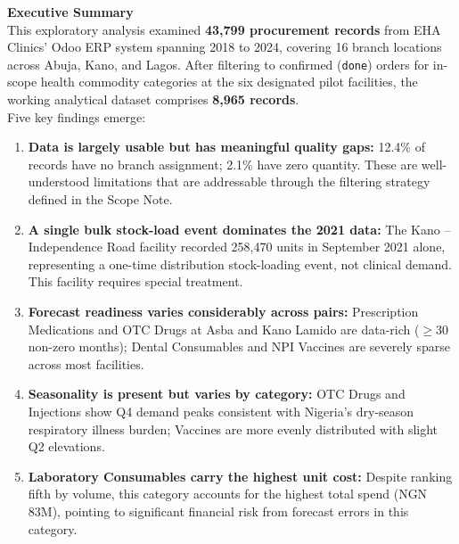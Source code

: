 \documentclass[12pt, a4paper]{article}
\newcounter{finding}
\begin{document}
\begin{mdframed}[style=keybox]
\textbf{\large Executive Summary}\\[0.6em]
This exploratory analysis examined \textbf{43,799 procurement records} from
EHA Clinics' Odoo ERP system spanning 2018 to 2024, covering 16 branch
locations across Abuja, Kano, and Lagos. After filtering to confirmed
(\texttt{done}) orders for in-scope health commodity categories at the six
designated pilot facilities, the working analytical dataset comprises
\textbf{8,965 records}.\\[0.5em]

Five key findings emerge:
\begin{enumerate}[leftmargin=1.5em, itemsep=3pt]
  \item \textbf{Data is largely usable but has meaningful quality gaps:}
        12.4\% of records have no branch assignment; 2.1\% have zero quantity.
        These are well-understood limitations that are addressable through
        the filtering strategy defined in the Scope Note.
  \item \textbf{A single bulk stock-load event dominates the 2021 data:}
        The Kano -- Independence Road facility recorded 258,470 units in
        September 2021 alone, representing a one-time distribution stock-loading
        event, not clinical demand. This facility requires special treatment.
  \item \textbf{Forecast readiness varies considerably across pairs:}
        Prescription Medications and OTC Drugs at Asba and Kano Lamido are
        data-rich ($\geq$30 non-zero months); Dental Consumables and NPI
        Vaccines are severely sparse across most facilities.
  \item \textbf{Seasonality is present but varies by category:}
        OTC Drugs and Injections show Q4 demand peaks consistent with
        Nigeria's dry-season respiratory illness burden; Vaccines are
        more evenly distributed with slight Q2 elevations.
  \item \textbf{Laboratory Consumables carry the highest unit cost:}
        Despite ranking fifth by volume, this category accounts for the
        highest total spend (NGN 83M), pointing to significant financial
        risk from forecast errors in this category.
\end{enumerate}
\end{mdframed}

\newpage
\tableofcontents
\newpage

\end{document}
